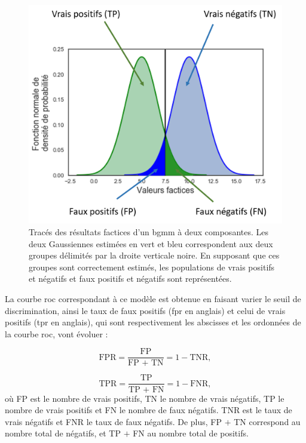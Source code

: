 \begin{figure}[h!]
  \centering
	\includegraphics[width=0.7\linewidth]{figures/chapter-4/tbr-bgmm-example} 
  \caption[Tracés des résultats factices d'un \gls{bgmm} à deux composantes.]{Tracés des résultats factices d'un \gls{bgmm} à deux composantes. Les deux Gaussiennes estimées en vert et bleu correspondent aux deux groupes délimités par la droite
	verticale noire. En supposant que ces groupes sont correctement estimés, les populations de vrais positifs et négatifs et faux positifs et négatifs sont représentées.} 
	\label{Figure:tbr_bgmm_example} 
\end{figure}

La courbe \gls{roc} correspondant à ce modèle est obtenue en faisant varier le seuil de discrimination, ainsi le taux de faux positifs (\gls{fpr} en anglais) 
et celui de vrais positifs (\gls{tpr} en anglais), qui sont respectivement les abscisses et les ordonnées de la courbe \gls{roc}, 
vont évoluer \citep[Chapitre~4]{James2013} : 

\begin{equation}
\label{eq:tbr_fpr_tpr}
\text{FPR} = \frac{\text{FP}}{\text{FP + TN}} = 1 - \text{TNR},
\end{equation}

\begin{equation}
\label{eq:tbr_tpr}
\text{TPR} = \frac{\text{TP}}{\text{TP + FN}} = 1 - \text{FNR},
\end{equation}
où FP est le nombre de vrais positifs, TN le nombre de vrais négatifs, TP le nombre de vrais positifs et FN le nombre de faux négatifs. 
TNR est le taux de vrais négatifs et FNR le taux de faux négatifs.
De plus, FP $+$ TN correspond au nombre total de négatifs, et TP $+$ FN au nombre total de positifs.

